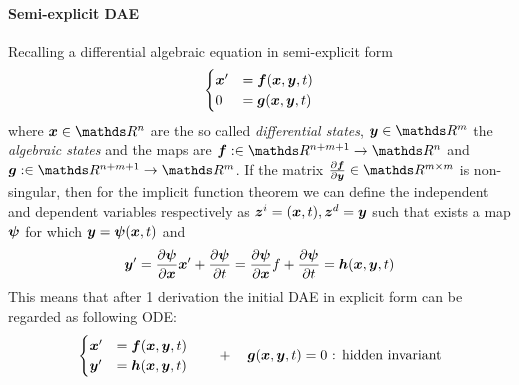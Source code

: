 	\paragraph{Semi-explicit DAE} Recalling a differential algebraic equation in semi-explicit form 
	\[\begin{cases}
		\boldsymbol{x}' & = \boldsymbol{f}(\boldsymbol{x}, \boldsymbol{y}, t) \\ 0 & = \boldsymbol{g}(\boldsymbol{x}, \boldsymbol{y}, t)
	\end{cases} \]
	where $\vett x\in \mathds R^n$ are the so called \textit{differential states}, $\vett y \in \mathds R^m$ the \textit{algebraic states} and the maps are $\vett f: \in \mathds R^{n+m+1}\rightarrow \mathds R^n$ and $\vett g: \in \mathds R^{n+m+1}\rightarrow \mathds R^m$. If the matrix $\pd{\vett f}{\vett y} \in \mathds R^{m\times m}$ is non-singular, then for the implicit function theorem we can define the independent and dependent variables respectively as $\boldsymbol{z}^i = (\boldsymbol{x}, t), \boldsymbol{z}^d = \boldsymbol{y}$ such that exists a map $\boldsymbol{\psi}$ for which $\boldsymbol{y} = \boldsymbol{\psi}(\boldsymbol{x}, t)$ and
	\[ \boldsymbol{y}' = \frac{\partial \boldsymbol{\psi}}{\partial \boldsymbol{x}} \boldsymbol{x}' + \frac{\partial \boldsymbol{\psi}}{\partial t} = \frac{\partial \boldsymbol{\psi}}{\partial \boldsymbol{x}} f + \frac{\partial \boldsymbol{\psi}}{\partial t} = \boldsymbol{h}(\boldsymbol{x}, \boldsymbol{y}, t) \]
	This means that after 1 derivation the initial DAE in explicit form can be regarded as following ODE:
	\[\begin{cases}
		\boldsymbol{x}' & = \boldsymbol{f}(\boldsymbol{x}, \boldsymbol{y}, t) \\ \boldsymbol{y}' & = \boldsymbol{h}(\boldsymbol{x}, \boldsymbol{y}, t)
	\end{cases}  \qquad + \quad \boldsymbol{g}(\boldsymbol{x}, \boldsymbol{y}, t) = 0 \textrm{ : hidden invariant}\]
	
	
	
	
	
	
	
	